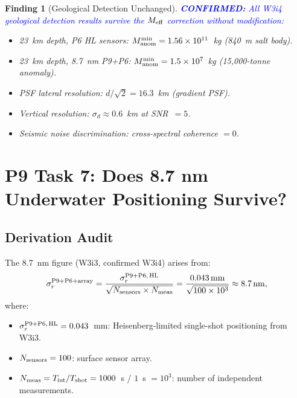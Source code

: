 \documentclass[aps,prd,twocolumn,superscriptaddress,nofootinbib]{revtex4-2}
\newcommand{\confirmed}[1]{\textcolor{blue}{\textbf{CONFIRMED:} #1}}
\newtheorem{finding}{Finding}
\begin{document}
\begin{finding}[Geological Detection Unchanged]
\label{find:geological}
\confirmed{All W3i4 geological detection results survive the $M_{\rm eff}$
correction without modification:}
\begin{itemize}
\item 23~km depth, P6 HL sensors: $M_{\rm anom}^{\min} = 1.56\times10^{11}$~kg
  (840~m salt body).
\item 23~km depth, 8.7~nm P9+P6: $M_{\rm anom}^{\min} = 1.5\times10^{7}$~kg
  (15,000-tonne anomaly).
\item PSF lateral resolution: $d/\sqrt{2} = 16.3$~km (gradient PSF).
\item Vertical resolution: $\sigma_d \approx 0.6$~km at SNR~$= 5$.
\item Seismic noise discrimination: cross-spectral coherence $= 0$.
\end{itemize}
\end{finding}

\section{P9 Task 7: Does 8.7 nm Underwater Positioning Survive?}
\label{sec:87nm}

\subsection{Derivation Audit}

The 8.7~nm figure (W3i3, confirmed W3i4) arises from:
\begin{equation}
\sigma_r^{\rm P9+P6+array} = \frac{\sigma_r^{\rm P9+P6,\,HL}}
{\sqrt{N_{\rm sensors} \times N_{\rm meas}}}
= \frac{0.043\,\mathrm{mm}}{\sqrt{100 \times 10^3}}
\approx 8.7\,\mathrm{nm},
\label{eq:87nm}
\end{equation}
where:
\begin{itemize}
\item $\sigma_r^{\rm P9+P6,\,HL} = 0.043$~mm: Heisenberg-limited
  single-shot positioning from W3i3.
\item $N_{\rm sensors} = 100$: surface sensor array.
\item $N_{\rm meas} = T_{\rm int}/T_{\rm shot} = 1000$~s / $1$~s
  $= 10^3$: number of independent measurements.
\end{itemize}
\end{document}
